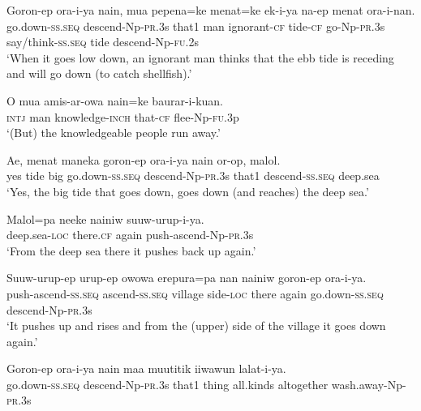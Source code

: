 \ea
\gll  Goron-ep  ora-i-ya  nain,  mua  pepena=ke  menat=ke           ek-i-ya  na-ep  menat  ora-i-nan. \\
go.down-\textsc{ss.seq}  descend-Np-\textsc{pr}.3s  that1  man  ignorant-\textsc{cf}  tide-\textsc{cf}  go-Np-\textsc{pr}.3s  say/think-\textsc{ss.seq}  tide  descend-Np-\textsc{fu}.2s \\


\glt ‘When it goes low down, an ignorant man thinks that the ebb tide is receding and will go down (to catch shellfish).’ \\
\z


\ea
\gll  O  mua  amis-ar-owa  nain=ke  baurar-i-kuan. \\
\textsc{intj}  man  knowledge-\textsc{inch}  that-\textsc{cf}  flee-Np-\textsc{fu}.3p \\
\glt ‘(But) the knowledgeable people run away.’ \\
\z


\ea
\gll  Ae,  menat  maneka  goron-ep  ora-i-ya  nain  or-op,                malol. \\
yes  tide  big  go.down-\textsc{ss.seq}  descend-Np-\textsc{pr}.3s  that1  descend-\textsc{ss.seq}   deep.sea \\


\glt ‘Yes, the big tide that goes down, goes down (and reaches) the deep sea.’ \\
\z


\ea
\gll  Malol=pa  neeke  nainiw  suuw-urup-i-ya. \\
deep.sea-\textsc{loc}  there.\textsc{cf}  again  push-ascend-Np-\textsc{pr}.3s \\
\glt ‘From the deep sea there it pushes back up again.’ \\
\z


\ea
\gll  Suuw-urup-ep  urup-ep  owowa  erepura=pa  nan  nainiw         goron-ep  ora-i-ya. \\
push-ascend-\textsc{ss.seq}  ascend-\textsc{ss.seq}  village  side-\textsc{loc}  there  again  go.down-\textsc{ss.seq}  descend-Np-\textsc{pr}.3s \\


\glt ‘It pushes up and rises and from the (upper) side of the village it goes down again.’ \\
\z


\ea
\gll  Goron-ep  ora-i-ya  nain  maa  muutitik  iiwawun                 lalat-i-ya. \\
go.down-\textsc{ss.seq}  descend-Np-\textsc{pr}.3s  that1  thing  all.kinds  altogether  wash.away-Np-\textsc{pr}.3s \\


